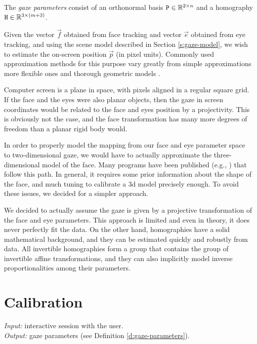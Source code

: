 \begin{definition} \label{d:gaze-parameters}
The \textit{gaze parameters} consist of an orthonormal basis $\mathtt{P} \in \mathbb{R}^{2\times n}$ and a homography $\mathtt{H} \in \mathbb{R}^{3 \times (m+3)}$.
\end{definition}

Given the vector $\vec f$ obtained from face tracking and vector $\vec e$ obtained from eye tracking, and using the scene model described in Section \ref{s:gaze-model}, we wish to estimate the on-screen position $\vec p$ (in pixel units).
Commonly used approximation methods for this purpose vary greatly from simple approximations \cite{zhu12} more flexible ones \cite{kassner14,yucel09} and thorough geometric models \cite{villanueva08,wang16}.

Computer screen is a plane in space, with pixels aligned in a regular square grid.
If the face and the eyes were also planar objects, then the gaze in screen coordinates would be related to the face and eyes position by a projectivity.
This is obviously not the case, and the face transformation has many more degrees of freedom than a planar rigid body would.
 
In order to properly model the mapping from our face and eye parameter space to two-dimensional gaze, we would have to actually approximate the three-dimensional model of the face.
Many programs have been published (e.g., \cite{fanelli11}) that follow this path.
In general, it requires some prior information about the shape of the face, and much tuning to calibrate a 3d model precisely enough.
To avoid these issues, we decided for a simpler approach.

We decided to actually assume the gaze is given by a projective transformation of the face and eye parameters.
This approach is limited and even in theory, it does never perfectly fit the data.
On the other hand, homographies have a solid mathematical background, and they can be estimated quickly and robustly from data.
All invertible homographies form a group that contains the group of invertible affine transformations, and they can also implicitly model inverse proportionalities among their parameters.



\section{Calibration}

\textit{Input:} interactive session with the user.\\
\textit{Output:} gaze parameters (see Definition \ref{d:gaze-parameters}).\\

